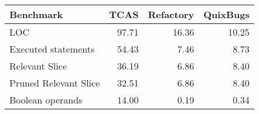 \begin{tabular}{lrrr}
\toprule
\textbf{Benchmark} & \textbf{TCAS} & \textbf{Refactory} & \textbf{QuixBugs} \\
\midrule
LOC & 97.71 & 16.36 & 10.25 \\
Executed statements & 54.43 & 7.46 & 8.73 \\
Relevant Slice & 36.19 & 6.86 & 8.40 \\
Pruned Relevant Slice & 32.51 & 6.86 & 8.40 \\
Boolean operands & 14.00 & 0.19 & 0.34 \\
\bottomrule
\end{tabular}
